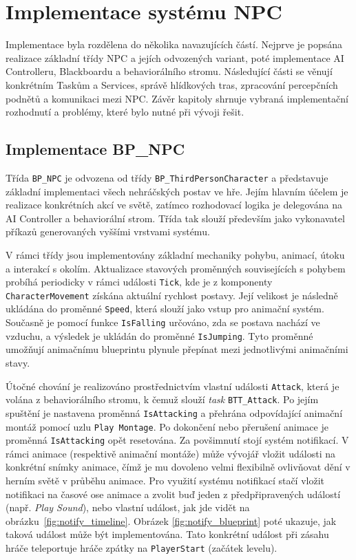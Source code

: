 \chapter{Implementace systému NPC}
\label{sec:implementace}

Implementace byla rozdělena do několika navazujících částí. 
Nejprve je popsána realizace základní třídy NPC a jejích odvozených variant, poté implementace AI Controlleru, Blackboardu a behaviorálního stromu. 
Následující části se věnují konkrétním Taskům a Services, správě hlídkových tras, zpracování percepčních podnětů a komunikaci mezi NPC. 
Závěr kapitoly shrnuje vybraná implementační rozhodnutí a problémy, které bylo nutné při vývoji řešit. 

\section{Implementace BP\_NPC}
\label{sec:implementace-bp-npc}

Třída \texttt{BP\_NPC} je odvozena od třídy \texttt{BP\_ThirdPersonCharacter} a představuje základní implementaci všech nehráčských postav ve hře. 
Jejím hlavním účelem je realizace konkrétních akcí ve světě, zatímco rozhodovací logika je delegována na AI Controller a behaviorální strom. 
Třída tak slouží především jako vykonavatel příkazů generovaných vyššími vrstvami systému.

V rámci třídy jsou implementovány základní mechaniky pohybu, animací, útoku a interakcí s okolím. 
Aktualizace stavových proměnných souvisejících s pohybem probíhá periodicky v rámci události \texttt{Tick}, kde je z komponenty \texttt{CharacterMovement} získána aktuální rychlost postavy. 
Její velikost je následně ukládána do proměnné \texttt{Speed}, která slouží jako vstup pro animační systém. 
Současně je pomocí funkce \texttt{IsFalling} určováno, zda se postava nachází ve vzduchu, a výsledek je ukládán do proměnné \texttt{IsJumping}. 
Tyto proměnné umožňují animačnímu blueprintu plynule přepínat mezi jednotlivými animačními stavy.

Útočné chování je realizováno prostřednictvím vlastní události \texttt{Attack}, která je volána z behaviorálního stromu, k čemuž slouží \textit{task} \texttt{BTT\_Attack}. 
Po jejím spuštění je nastavena proměnná \texttt{IsAttacking} a přehrána odpovídající animační montáž pomocí uzlu \texttt{Play Montage}. 
Po dokončení nebo přerušení animace je proměnná \texttt{IsAttacking} opět resetována. 
Za povšimnutí stojí systém notifikací. V rámci animace (respektivě animační montáže) může vývojář vložit události na konkrétní snímky 
animace, čímž je mu dovoleno velmi flexibilně ovlivňovat dění v herním světě v průběhu animace.
Pro využití systému notifikací stačí vložit notifikaci na časové ose animace a zvolit buď jeden z předpřipravených 
událostí (např. \textit{Play Sound}), nebo vlastní událost, jak jde vidět na obrázku~\ref{fig:notify_timeline}.
Obrázek \ref{fig:notify_blueprint} poté ukazuje, jak taková událost může být implementována.
Tato konkrétní událost při zásahu hráče teleportuje hráče zpátky na \texttt{PlayerStart} (začátek levelu).

